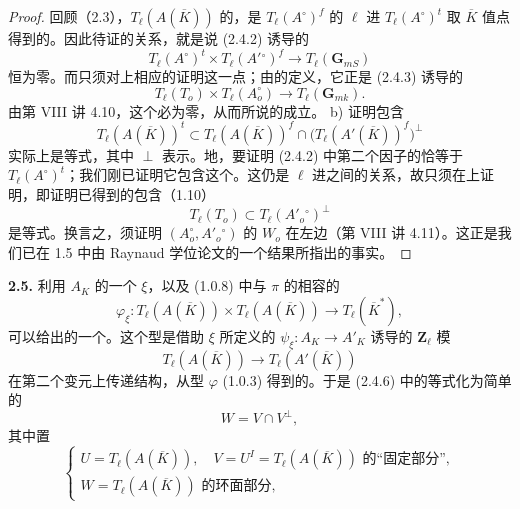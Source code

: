 \begin{proof}
回顾（2.3），$T_\ell(A(\overline K))$ 的，是 $T_\ell(A^\circ)^f$ 的 $\ell$ 进 $T_\ell(A^\circ)^t$ 取 $\overline K$ 值点得到的。因此待证的关系，就是说 (2.4.2) 诱导的
\[T_\ell(A^\circ)^t\times T_\ell(A'{}^\circ)^f\longrightarrow T_\ell(\mathbf G_{mS})\tag{2.4.4}\]
恒为零。而只须对上相应的证明这一点；由的定义，它正是 (2.4.3) 诱导的
\[T_\ell(T_o)\times T_\ell(A_o^\circ)\longrightarrow T_\ell(\mathbf G_{mk}).\tag{2.4.5}\]
由第 VIII 讲 4.10，这个必为零，从而所说的成立。
b) 证明包含
\[T_\ell(A(\overline K))^t\subset T_\ell(A(\overline K))^f\cap\bigl(T_\ell(A'(\overline K))^f\bigr)^\perp\tag{2.4.6}\]
实际上是等式，其中 $\perp$ 表示。地，要证明 (2.4.2) 中第二个因子的恰等于 $T_\ell(A^\circ)^t$；我们刚已证明它包含这个。这仍是 $\ell$ 进之间的关系，故只须在上证明，即证明已得到的包含（1.10）
\[T_\ell(T_o)\subset T_\ell(A'_o{}^\circ)^\perp\tag{2.4.7}\]
是等式。换言之，须证明 $(A_o^\circ,A'_o{}^\circ)$ 的 $W_o$ 在左边（第 VIII 讲 4.11）。这正是我们已在 1.5 中由 Raynaud 学位论文的一个结果所指出的事实。
\end{proof}
\textbf{2.5.} 利用 $A_K$ 的一个 $\xi$，以及 (1.0.8) 中与 $\pi$ 的相容的
\[\varphi_\xi:T_\ell(A(\overline K))\times T_\ell(A(\overline K))\longrightarrow T_\ell(\overline K^*),\tag{2.5.1}\]
可以给出的一个。这个型是借助 $\xi$ 所定义的 $\psi_\xi:A_K\to A'_K$ 诱导的 $\mathbf Z_\ell$ 模
\[T_\ell(A(\overline K))\longrightarrow T_\ell(A'(\overline K))\]
在第二个变元上传递结构，从型 $\varphi$ (1.0.3) 得到的。于是 (2.4.6) 中的等式化为简单的
\[W=V\cap V^\perp,\tag{2.5.2}\]
其中置
\[\begin{cases}
U=T_\ell(A(\overline K)),\quad V=U^I=T_\ell(A(\overline K))\text{ 的“固定部分”},\\
W=T_\ell(A(\overline K))\text{ 的环面部分},
\end{cases}\tag{2.5.3}\]
